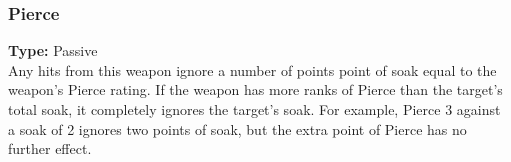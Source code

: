 \subsubsection{Pierce}
\label{iqty:pierce}
\textbf{Type:} Passive\\
Any hits from this weapon ignore a number of points
point of soak equal to the weapon’s Pierce rating. If the
weapon has more ranks of Pierce than the target’s total
soak, it completely ignores the target’s soak. For example,
Pierce 3 against a soak of 2 ignores two points of
soak, but the extra point of Pierce has no further effect.
